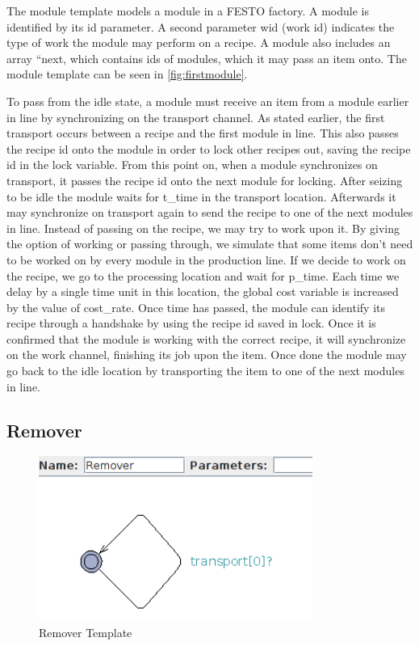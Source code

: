 The module template models a module in a FESTO factory. A module is identified by its id parameter. A second parameter wid (work id) indicates the type of work the module may perform on a recipe. A module also includes  an array “next, which contains ids of modules, which it may pass an item onto. The module template can be seen in \cref{fig:firstmodule}.

To pass from the idle state, a module must receive an item from a module earlier in line by   synchronizing on the transport channel. As stated earlier, the first transport occurs between a recipe and the first module in line. This also passes the recipe id onto the module in order to lock other recipes out, saving the recipe id in the lock variable. From this point on, when a module synchronizes on transport, it passes the recipe id onto the next module for locking. After seizing to be idle the module waits for t\_time in the transport location. Afterwards it may synchronize on transport again to send the recipe to one of the next modules in line. Instead of passing on the recipe, we may try to work upon it. By giving the option of working or passing through, we simulate that some items don’t need to be worked on by every module in the production line. If we decide to work on the recipe, we go to the  processing location and wait for p\_time. Each time we delay by a single time unit in this location, the global cost variable is increased by the value of cost\_rate. Once time has passed, the module can identify its recipe through a handshake by using the recipe id saved in lock. Once it is confirmed that the module is working with the correct recipe, it will synchronize on the work channel, finishing its job upon the item. Once done the module may go back to the idle location by transporting the item to one of the next modules in line. 


\subsection{Remover}

\begin{figure}
\centering
\includegraphics[width=0.8\textwidth]{images/firstremover.png}
\caption{Remover Template}
\label{fig:firstremover}
\end{figure}


